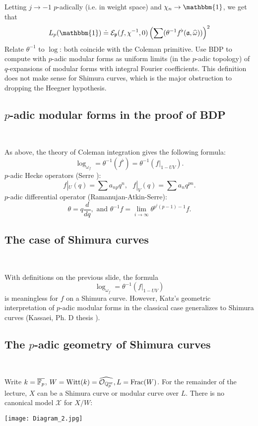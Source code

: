 \documentclass[12pt,amsfont]{amsart}
\begin{document}
Letting $j \rightarrow -1$ $p$-adically (i.e. in weight space) and $\chi_n \rightarrow \mathbbm{1}$, we get that
\[L_p(\mathbbm{1}) \doteq \E_\fp(f, \chi^{-1}, 0) \left(\sum (\theta^{-1} f^\flat(\mathfrak{a}, \widehat{\omega}))\right)^2 \]
Relate $\theta^{-1}$ to $\log$: both coincide with the Coleman primitive. Use BDP to compute with $p$-adic modular forms as uniform limits (in the $p$-adic topology) of $q$-expansions of modular forms with integral Fourier coefficients. This definition does not make sense for Shimura curves, which is the major obstruction to dropping the Heegner hypothesis. 

\subsection{$p$-adic modular forms in the proof of BDP}
{\ }

As above, the theory of Coleman integration gives the following formula:
\[\log_{\omega_f} = \theta^{-1} (f^\flat) = \theta^{-1} (f |_{1 - UV}).\]
$p$-adic Hecke operators (Serre ): 
\[f |_U (q) = \sum a_{np} q^n, \text{ } f |_V(q) = \sum a_n q^{pn}.\]
$p$-adic differential operator (Ramanujan-Atkin-Serre):
\[\theta = q \frac{d}{dq}, \text{ and } \theta^{-1} f = \lim_{i \rightarrow \infty} \theta^{p^i(p-1) -1} f. \]

\subsection{The case of Shimura curves}
{\ }

With definitions on the previous slide, the formula
\[\log_{\omega_f} = \theta^{-1} (f |_{1 - UV})\]
is meaningless for $f$ on a Shimura curve. However, Katz's geometric interpretation of $p$-adic modular forms in the classical case generalizes to Shimura curves (Kassaei, Ph. D thesis ). 

\subsection{The $p$-adic geometry of Shimura curves}
{\ }

Write $k = \overline{{\mathbb F}_p}$, $W = \operatorname{Witt}(k) = \widehat{\mathcal{O}_{{\mathbb Q}_p^{\text{ur}}}}, L = \operatorname{Frac}(W)$. For the remainder of the lecture, $X$ can be a Shimura curve or modular curve over $L$. There is no canonical model $\mathcal{X}$ for $X/W$: 

{\begin{center}  \texttt{[image: Diagram\_2.jpg]}
\end{center}}
\end{document}
